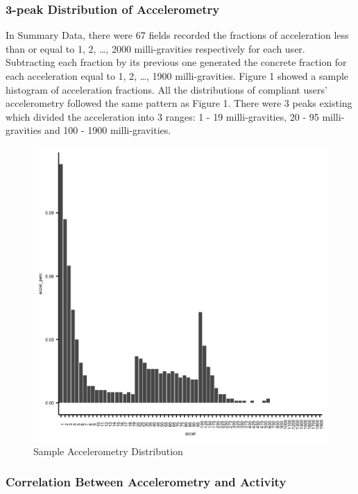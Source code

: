 \documentclass[12pt]{article}
\begin{document}
\hypertarget{peak-distribution-of-accelerometry}{%
\subsubsection{3-peak Distribution of
Accelerometry}\label{peak-distribution-of-accelerometry}}

In Summary Data, there were 67 fields recorded the fractions of
acceleration less than or equal to 1, 2, \ldots, 2000 milli-gravities
respectively for each user. Subtracting each fraction by its previous
one generated the concrete fraction for each acceleration equal to 1, 2,
\ldots, 1900 milli-gravities. Figure 1 showed a sample histogram of
acceleration fractions. All the distributions of compliant users'
accelerometry followed the same pattern as Figure 1. There were 3 peaks
existing which divided the acceleration into 3 ranges: 1 - 19
milli-gravities, 20 - 95 milli-gravities and 100 - 1900 milli-gravities.

\begin{figure}[h]

{\centering \includegraphics[width=0.75\linewidth,height=0.35\textheight,]{fig1} 

}

\caption{Sample Accelerometry Distribution}\label{fig:unnamed-chunk-4}
\end{figure}

\hypertarget{correlation-between-accelerometry-and-activity}{%
\subsubsection{Correlation Between Accelerometry and
Activity}\label{correlation-between-accelerometry-and-activity}}
\end{document}
